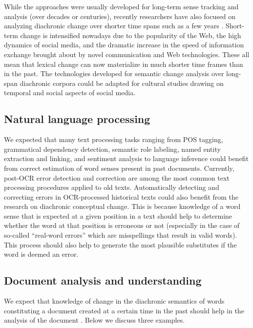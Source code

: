 \documentclass[output=paper%
]{langsci/langscibook}
\begin{document}
While 
 the approaches were usually developed for long-term sense tracking and analysis (over decades or centuries),
recently researchers have also focused on analyzing diachronic change over shorter time spans such as a few years \citep{dodds-etal-2011,danescu2013no,eisenstein-etal-2014,goel2016social,deltredici-fernandez-2018}. Short-term change is intensified nowadays due to the popularity of the Web, the high dynamics of social media, and the dramatic increase in the speed of information exchange brought about by novel communication and Web technologies. These all mean that lexical change can now materialize in much shorter time frames than in the past. The technologies developed for semantic change analysis over long-span diachronic corpora could be adapted for cultural studies drawing on temporal and social aspects of social media.

\subsection{Natural language processing} 
We expected that many text processing tasks ranging from POS tagging, grammatical dependency detection, semantic role labeling, named entity extraction and linking, and sentiment analysis to language inference could benefit from correct estimation of word senses present in past documents. Currently,  post-OCR error detection and correction are among the most common text processing procedures applied to old texts. Automatically detecting and correcting errors in OCR-processed historical texts \citep{chiron2017icdar2017} could also benefit from the research on diachronic conceptual change. This is because  knowledge of a word sense that is expected at a given position in a text should help to determine whether the word at that position is erroneous or not (especially in the case of so-called ``real-word errors'' which are misspellings that result in valid words). This process should also help to generate the most plausible substitutes if the word is deemed an error. 


\subsection{Document analysis and understanding}
We expect that  knowledge of change in the diachronic semantics of words constituting a document created at a certain time in the past should help in the analysis of the document \citep{tahmasebi2013models}. 
Below we discuss three examples.
\end{document}
